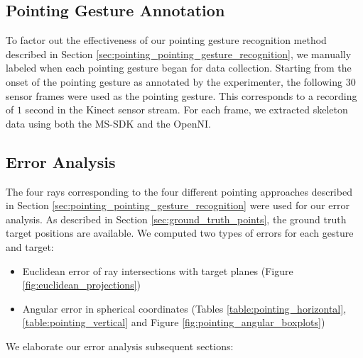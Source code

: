 \subsection{Pointing Gesture Annotation}
\label{sec:pointing_gesture_annotation}

To factor out the effectiveness of our pointing gesture recognition method described in Section \ref{sec:pointing_pointing_gesture_recognition}, we manually labeled when each pointing gesture began for data collection. Starting from the onset of the pointing gesture as annotated by the experimenter, the following $30$ sensor frames were used as the pointing gesture. This corresponds to a recording of $1$ second in the Kinect sensor stream. For each frame, we extracted skeleton data using both the MS-SDK and the OpenNI.

\subsection{Error Analysis}
\label{sec:pointing_error_analysis}

The four rays corresponding to the four different pointing approaches described in Section \ref{sec:pointing_pointing_gesture_recognition} were used for our error analysis.  As described in Section \ref{sec:ground_truth_points}, the ground truth target positions are available. We computed two types of errors for each gesture and target:

\begin{itemize}
\item Euclidean error of ray intersections with target planes (Figure \ref{fig:euclidean_projections})
\item Angular error in spherical coordinates (Tables \ref{table:pointing_horizontal},\ref{table:pointing_vertical} and Figure \ref{fig:pointing_angular_boxplots})
\end{itemize}

We elaborate our error analysis subsequent sections:




